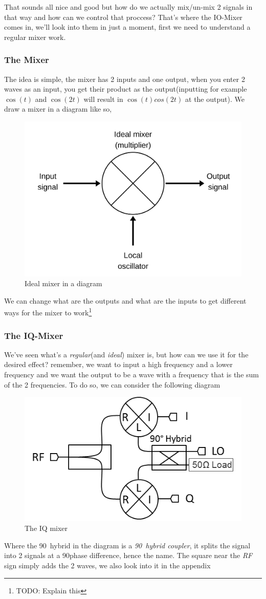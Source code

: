 \documentclass[english, a4paper, 12pt, twoside]{article}
\numberwithin{equation}{section} %
\begin{document}
That sounds all nice and good but how do we actually mix/un-mix 2 signals in that way and how can we control that proccess? That's where the IO-Mixer comes in, we'll look into them in just a moment, first we need to understand a regular mixer work.

\subsubsection{The Mixer}
The idea is simple, the mixer has 2 inputs and one output, when you enter 2 waves as an input, you get their product as the output(inputting for example $\cos(t)$ and $\cos(2t)$ will result in $\cos(t)cos(2t)$ at the output). %
We draw a mixer in a diagram like so,

\begin{figure}[H]
    \centering
    \includegraphics[width=0.3\columnwidth]{Ideal-Mixer.png} %
    \caption{Ideal mixer in a diagram}
    \label{fig:Ideal-Mixer}
\end{figure}
We can change what are the outputs and what are the inputs to get different ways for the mixer to work\footnote{TODO: Explain this} %

\subsubsection{The IQ-Mixer}
We've seen what's a \textit{regular}(and \textit{ideal}) mixer is, but how can we use it for the desired effect? remember, we want to input a high frequency and a lower frequency and we want the output to be a wave with a frequency that is the sum of the 2 frequencies. To do so, we can consider the following diagram
\begin{figure}[H]
    \centering
    \includegraphics[width=0.5\columnwidth]{IQ-Mixer.png} %
    \caption{The IQ mixer}
    \label{fig:IQ-Mixer}
\end{figure}
Where the 90\degree\ hybrid in the diagram is a \textit{90\degree\  hybrid coupler}, it splits the signal into 2 signals at a 90\degree phase difference, hence the name. The square near the \textit{RF} sign simply adds the 2 waves, we also look into it in the appendix %
\end{document}
